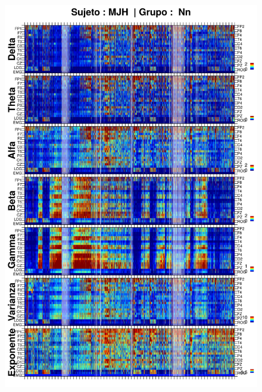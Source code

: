 \begin{figure}
\centering
\includegraphics[width=0.9\linewidth]
{./img_resultados/MJNNVIGILOS_espectral_total.png} 
\end{figure}

